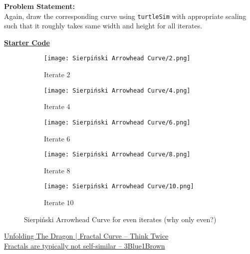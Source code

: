 \documentclass[../../Problems]{subfiles}
\begin{document}
\textbf{Problem Statement:}\\
Again, draw the corresponding curve using \verb!turtleSim! with appropriate scaling such that it roughly takes same width and height for all iterates.
\begin{tcolorbox}%
	\href{https://github.com/paramrathour/CS-101/blob/main/Starter%20Codes/Sierpi%C5%84ski%20Arrowhead%20Curve.cpp}{\textbf{Starter Code}}
\end{tcolorbox}
\begin{figure}[H]
	\centering
	\begin{subfigure}{0.18\linewidth}
		\texttt{[image: Sierpiński Arrowhead Curve/2.png]}
		\caption{Iterate $2$}
	\end{subfigure}
	\begin{subfigure}{0.18\linewidth}
		\texttt{[image: Sierpiński Arrowhead Curve/4.png]}
		\caption{Iterate $4$}
	\end{subfigure}
	\begin{subfigure}{0.18\linewidth}
		\texttt{[image: Sierpiński Arrowhead Curve/6.png]}
		\caption{Iterate $6$}
	\end{subfigure}
	\begin{subfigure}{0.18\linewidth}
		\texttt{[image: Sierpiński Arrowhead Curve/8.png]}
		\caption{Iterate $8$}
	\end{subfigure}
	\begin{subfigure}{0.18\linewidth}
		\texttt{[image: Sierpiński Arrowhead Curve/10.png]}
		\caption{Iterate $10$}
	\end{subfigure}
	\caption{Sierpi\'nski Arrowhead Curve for even iterates (why only even?)}
\end{figure}
\begin{funvideo}
	\href{https://youtu.be/UBuPWdSbyf8}{Unfolding The Dragon | Fractal Curve -- Think Twice}\\
	\href{https://youtu.be/gB9n2gHsHN4}{Fractals are typically not self-similar -- 3Blue1Brown}
\end{funvideo}
\end{document}
